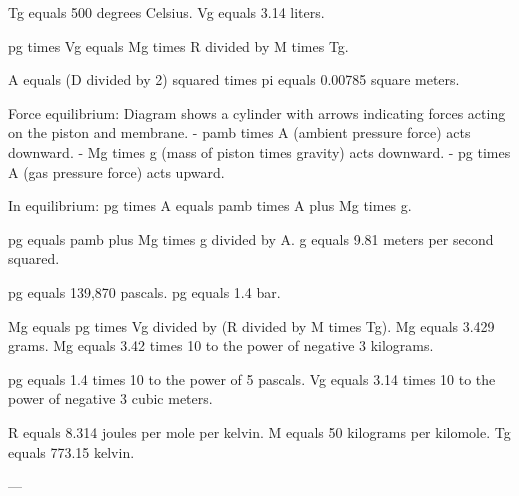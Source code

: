 Tg equals 500 degrees Celsius.  
Vg equals 3.14 liters.  

pg times Vg equals Mg times R divided by M times Tg.  

A equals (D divided by 2) squared times pi equals 0.00785 square meters.  

Force equilibrium:  
Diagram shows a cylinder with arrows indicating forces acting on the piston and membrane.  
- pamb times A (ambient pressure force) acts downward.  
- Mg times g (mass of piston times gravity) acts downward.  
- pg times A (gas pressure force) acts upward.  

In equilibrium:  
pg times A equals pamb times A plus Mg times g.  

pg equals pamb plus Mg times g divided by A.  
g equals 9.81 meters per second squared.  

pg equals 139,870 pascals.  
pg equals 1.4 bar.  

Mg equals pg times Vg divided by (R divided by M times Tg).  
Mg equals 3.429 grams.  
Mg equals 3.42 times 10 to the power of negative 3 kilograms.  

pg equals 1.4 times 10 to the power of 5 pascals.  
Vg equals 3.14 times 10 to the power of negative 3 cubic meters.  

R equals 8.314 joules per mole per kelvin.  
M equals 50 kilograms per kilomole.  
Tg equals 773.15 kelvin.  

---